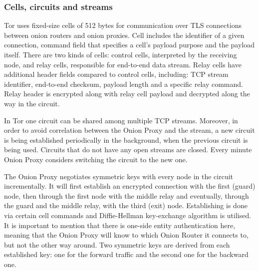 \subsubsection{Cells, circuits and streams}
Tor uses fixed-size cells of 512 bytes for communication over TLS connections between onion routers and onion proxies. Cell includes the identifier of a given connection, command field that specifies a cell’s payload purpose and the payload itself. There are two kinds of cells: control cells, interpreted by the receiving node, and relay cells, responsible for end-to-end data stream. Relay cells have additional header fields compared to control cells, including: TCP stream identifier, end-to-end checksum, payload length and a specific relay command. Relay header is encrypted along with relay cell payload and decrypted along the way in the circuit.

In Tor one circuit can be shared among multiple TCP streams. Moreover, in order to avoid correlation between the Onion Proxy and the stream, a new circuit is being established periodically in the background, when the previous circuit is being used. Circuits that do not have any open streams are closed. Every minute Onion Proxy considers switching the circuit to the new one.

The Onion Proxy negotiates symmetric keys with every node in the circuit incrementally. It will first establish an encrypted connection with the first (guard) node, then through the first node with the middle relay and eventually, through the guard and the middle relay, with the third (exit) node. Establishing is done via certain cell commands and Diffie-Hellman key-exchange algorithm is utilised. It is important to mention that there is one-side entity authentication here, meaning that the Onion Proxy will know to which Onion Router it connects to, but not the other way around. Two symmetric keys are derived from each established key: one for the forward traffic and the second one for the backward one.

